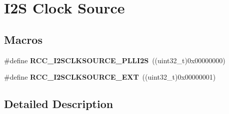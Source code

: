 \hypertarget{group___r_c_c_ex___i2_s___clock___source}{}\section{I2S Clock Source}
\label{group___r_c_c_ex___i2_s___clock___source}
\subsection*{Macros}
\begin{DoxyCompactItemize}
\item 
\#define {\bfseries R\+C\+C\+\_\+\+I2\+S\+C\+L\+K\+S\+O\+U\+R\+C\+E\+\_\+\+P\+L\+L\+I2S}~((uint32\+\_\+t)0x00000000)\hypertarget{group___r_c_c_ex___i2_s___clock___source_ga77d2d5726213f7452c87251cfddc9d6a}{}\label{group___r_c_c_ex___i2_s___clock___source_ga77d2d5726213f7452c87251cfddc9d6a}

\item 
\#define {\bfseries R\+C\+C\+\_\+\+I2\+S\+C\+L\+K\+S\+O\+U\+R\+C\+E\+\_\+\+E\+XT}~((uint32\+\_\+t)0x00000001)\hypertarget{group___r_c_c_ex___i2_s___clock___source_gaf36ed164172cd329651775784798a3ba}{}\label{group___r_c_c_ex___i2_s___clock___source_gaf36ed164172cd329651775784798a3ba}

\end{DoxyCompactItemize}


\subsection{Detailed Description}
